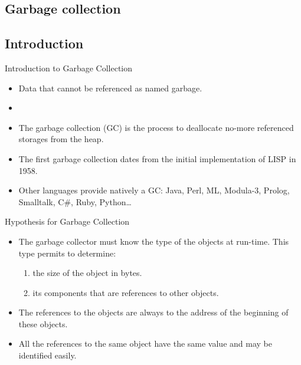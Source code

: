 \begin{bibunit}[apalike]
\section{Garbage collection}

\tableofcontentslide[sections={2-6},sectionstyle={show/shaded},subsectionstyle={show/show/hide},subsubsectionstyle={hide/hide/hide/hide}]

\subsection{Introduction}

\begin{frame}{Introduction to Garbage Collection}
	\begin{itemize}
	\item Data that cannot be referenced as named garbage.
	\item {}
	\item The garbage collection (GC) is the process to deallocate no-more referenced storages from the heap.
	\vfill
	\item The first garbage collection dates from the initial implementation of LISP in 1958.
	\item Other languages provide natively a GC: Java, Perl, ML, Modula-3, Prolog, Smalltalk, C\#, Ruby, Python\dots
	\end{itemize}
\end{frame}

\begin{frame}{Hypothesis for Garbage Collection}
	\begin{itemize}
	\item The garbage collector must know the type of the objects at run-time. This type permits to determine:
		\begin{enumerate}
		\item the size of the object in bytes.
		\item its components that are references to other objects.
		\end{enumerate}
	\vfill
	\item The references to the objects are always to the address of the beginning of these objects.
	\item All the references to the same object have the same value and may be identified easily.
	\end{itemize}
\end{frame}


\end{bibunit}
